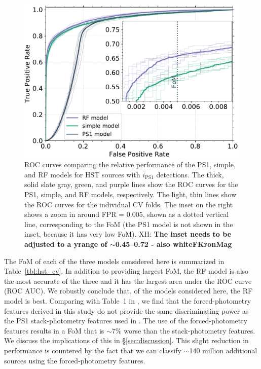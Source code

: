 \documentclass[twocolumn]{aastex63}
\newcommand{\xander}[1]{{\color{red} XH: \textbf{#1}}}
\begin{document}
\begin{figure}[t]
 \centering
  \includegraphics[width=\columnwidth]{./Figures/CV_ROC_FHST.pdf}
  \caption{ ROC curves comparing the relative performance of the PS1, simple,
  and RF models for HST sources with $i_\mathrm{PS1}$ detections. The thick,
  solid slate gray, green, and purple lines show the ROC curves for the PS1,
  simple, and RF models, respectively. The light, thin lines show the ROC
  curves for the individual CV folds. The inset on the right shows a zoom in
  around FPR = 0.005, shown as a dotted vertical line, corresponding to the
  FoM (the PS1 model is not shown in the inset, because it has very low FoM).
  \xander{The inset needs to be adjusted to a yrange of $\sim$0.45--0.72 -
  also whiteFKronMag}}
  \label{fig:hst_roc}
\end{figure}

The FoM of each of the three models considered here is summarized in
Table~\ref{tbl:hst_cv}. In addition to providing largest FoM, the RF model is
also the most accurate of the three and it has the largest area under the ROC
curve (ROC AUC). We robustly conclude that, of the models considered here, the
RF model is best. Comparing with Table~1 in \citet{Tachibana18}, we find that
the forced-photometry features derived in this study do not provide the same
discriminating power as the PS1 stack-photometry features used in
\citet{Tachibana18}. The use of the forced-photometry features results in a
FoM that is $\sim$7\% worse than the stack-photometry features. We discuss the
implications of this in \S\ref{sec:discussion}. This slight reduction in
performance is countered by the fact that we can classify $\sim$140 million
additional sources using the forced-photometry features.
\end{document}
